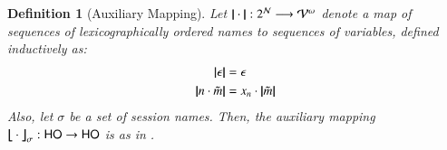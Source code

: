 \documentclass[preprint,11pt]{elsarticle}
\newtheorem{definition}{Definition}[section]
\newtheorem{proposition}{Proposition}[section]
\begin{document}
{{%

%

%




\begin{definition}[Auxiliary Mapping] \label{d:trabs}\label{d:auxmap}
	Let $|\!|\cdot|\!|: 2^{\mathcal{N}} \longrightarrow \mathcal{V}^\omega$
	denote a map of sequences of lexicographically ordered names to sequences of variables, defined
	inductively 
	as: 
	\begin{align*}
	|\!|\epsilon|\!| & = \epsilon 
	\\
	|\!|n \cdot \tilde{m}|\!| & = x_n \cdot |\!|\tilde{m}|\!|
	\end{align*}
	Also, let $\sigma$ be a set of session names.
	Then, the auxiliary mapping
	$\big\lfloor\!\!\big\lfloor\cdot\big\rfloor\!\!\big\rfloor^{}_\sigma: \mathsf{HO} \to \mathsf{HO}$
	is as in .
\end{definition}

%





}}
\end{document}
